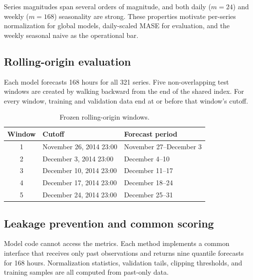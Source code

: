 \documentclass[11pt,a4paper]{article}
\begin{document}
Series magnitudes span several orders of magnitude, and both daily ($m=24$) and weekly
($m=168$) seasonality are strong. These properties motivate per-series normalization for global
models, daily-scaled MASE for evaluation, and the weekly seasonal naive as the operational bar.

\subsection{Rolling-origin evaluation}

Each model forecasts 168 hours for all 321 series. Five non-overlapping test windows are created by
walking backward from the end of the shared index. For every window, training and validation data
end at or before that window's cutoff.

\begin{table}[htbp]
\centering
\caption{Frozen rolling-origin windows.}
\label{tab:windows}
\begin{tabular}{@{}cll@{}}
\toprule
Window & Cutoff & Forecast period\\
\midrule
1 & November 26, 2014 23:00 & November 27--December 3\\
2 & December 3, 2014 23:00 & December 4--10\\
3 & December 10, 2014 23:00 & December 11--17\\
4 & December 17, 2014 23:00 & December 18--24\\
5 & December 24, 2014 23:00 & December 25--31\\
\bottomrule
\end{tabular}
\end{table}

\subsection{Leakage prevention and common scoring}

Model code cannot access the metrics. Each method implements a common interface that receives only
past observations and returns nine quantile forecasts for 168 hours. Normalization statistics,
validation tails, clipping thresholds, and training samples are all computed from past-only data.
\end{document}
